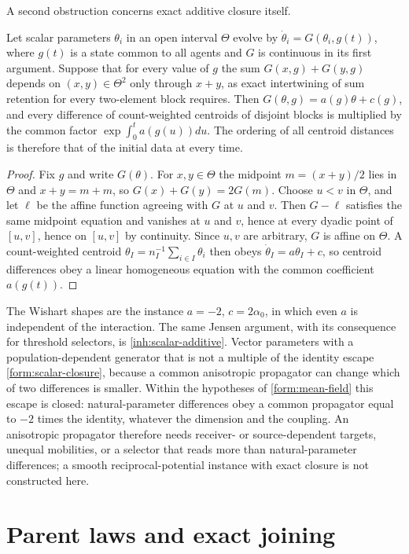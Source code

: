 A second obstruction concerns exact additive closure itself.

Let scalar parameters $\theta_i$ in an open interval $\Theta$ evolve by $\dot\theta_i=G(\theta_i,g(t))$, where $g(t)$ is a state common to all agents and $G$ is continuous in its first argument. Suppose that for every value of $g$ the sum $G(x,g)+G(y,g)$ depends on $(x,y)\in\Theta^2$ only through $x+y$, as exact intertwining of sum retention for every two-element block requires. Then $G(\theta,g)=a(g)\theta+c(g)$, and every difference of count-weighted centroids of disjoint blocks is multiplied by the common factor $\exp\int_0^ta(g(u))du$. The ordering of all centroid distances is therefore that of the initial data at every time.

\begin{proof}
Fix $g$ and write $G(\theta)$. For $x,y\in\Theta$ the midpoint $m=(x+y)/2$ lies in $\Theta$ and $x+y=m+m$, so $G(x)+G(y)=2G(m)$. Choose $u<v$ in $\Theta$, and let $\ell$ be the affine function agreeing with $G$ at $u$ and $v$. Then $G-\ell$ satisfies the same midpoint equation and vanishes at $u$ and $v$, hence at every dyadic point of $[u,v]$, hence on $[u,v]$ by continuity. Since $u,v$ are arbitrary, $G$ is affine on $\Theta$. A count-weighted centroid $\theta_I=n_I^{-1}\sum_{i\in I}\theta_i$ then obeys $\dot\theta_I=a\theta_I+c$, so centroid differences obey a linear homogeneous equation with the common coefficient $a(g(t))$.
\end{proof}

The Wishart shapes are the instance $a=-2$, $c=2\alpha_0$, in which even $a$ is independent of the interaction. The same Jensen argument, with its consequence for threshold selectors, is \cref{inh:scalar-additive}. Vector parameters with a population-dependent generator that is not a multiple of the identity escape \cref{form:scalar-closure}, because a common anisotropic propagator can change which of two differences is smaller. Within the hypotheses of \cref{form:mean-field} this escape is closed: natural-parameter differences obey a common propagator equal to $-2$ times the identity, whatever the dimension and the coupling. An anisotropic propagator therefore needs receiver- or source-dependent targets, unequal mobilities, or a selector that reads more than natural-parameter differences; a smooth reciprocal-potential instance with exact closure is not constructed here.

\section{Parent laws and exact joining}

